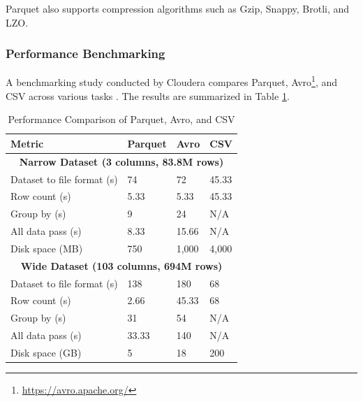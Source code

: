 Parquet also supports compression algorithms such as Gzip, Snappy, Brotli, and LZO.

\subsubsection{Performance Benchmarking}

A benchmarking study conducted by Cloudera compares Parquet, Avro\footnote{\url{https://avro.apache.org/}}, and \ac{CSV} across various tasks \cite{parquet}. The results are summarized in Table \ref{table:parquetbenchmark}.

\begin{table}[h!]
    \centering
    \begin{tabular}{|l|l|l|l|}
    \hline
    \textbf{Metric}                 & \textbf{Parquet} & \textbf{Avro} & \textbf{CSV}  \\ \hline
    \multicolumn{4}{|c|}{\textbf{Narrow Dataset (3 columns, 83.8M rows)}} \\ \hline
    Dataset to file format (s)      & 74               & 72            & 45.33         \\ \hline
    Row count (s)                   & 5.33             & 5.33          & 45.33         \\ \hline
    Group by (s)                    & 9                & 24            & N/A           \\ \hline
    All data pass (s)               & 8.33             & 15.66         & N/A           \\ \hline
    Disk space (MB)                 & 750              & 1,000         & 4,000         \\ \hline
    \multicolumn{4}{|c|}{\textbf{Wide Dataset (103 columns, 694M rows)}}  \\ \hline
    Dataset to file format (s)      & 138              & 180           & 68            \\ \hline
    Row count (s)                   & 2.66             & 45.33         & 68            \\ \hline
    Group by (s)                    & 31               & 54            & N/A           \\ \hline
    All data pass (s)               & 33.33            & 140           & N/A           \\ \hline
    Disk space (GB)                 & 5                & 18            & 200           \\ \hline
    \end{tabular}
    \caption{Performance Comparison of Parquet, Avro, and \ac{CSV}}
    \label{table:parquetbenchmark}
\end{table}

